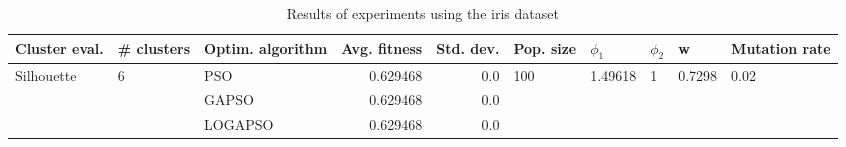 \begin{table}
\centering
\caption{Results of experiments using the iris dataset}
\begin{tabular}{lllrrlllll}
\toprule
              Cluster eval. &        \# clusters & Optim. algorithm &  Avg. fitness &  Std. dev. &            Pop. size &               $\phi_{1}$ &         $\phi_{2}$ &                       w &         Mutation rate \\
\midrule
\multirow{3}{*}{Silhouette} & \multirow{3}{*}{6} &              PSO &      0.629468 &        0.0 & \multirow{3}{*}{100} & \multirow{3}{*}{1.49618} & \multirow{3}{*}{1} & \multirow{3}{*}{0.7298} & \multirow{3}{*}{0.02} \\
                            &                    &            GAPSO &      0.629468 &        0.0 &                      &                          &                    &                         &                       \\
                            &                    &          LOGAPSO &      0.629468 &        0.0 &                      &                          &                    &                         &                       \\
\bottomrule
\end{tabular}
\end{table}
